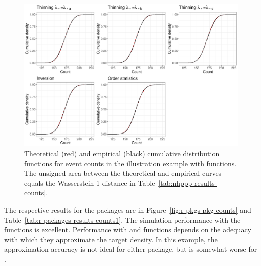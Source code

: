 \documentclass[article]{jss}\usepackage[]{graphicx}\usepackage[]{xcolor}
\makeatletter
\def\maxwidth{ %
  \ifdim\Gin@nat@width>\linewidth
    \linewidth
  \else
    \Gin@nat@width
  \fi
}
\makeatother
\begin{document}
\begin{Schunk}
\begin{figure}
\includegraphics[width=\maxwidth]{figure/ecdf-nhppp-pkg-counts-1} \caption{Theoretical (red) and empirical (black) cumulative distribution functions for event counts in the illustration example with  functions. The unsigned area between the theoretical and empirical curves equals the Wasserstein-1 distance in Table~\ref{tab:nhppp-results-counts}.}\label{fig:ecdf-nhppp-pkg-counts}
\end{figure}
\end{Schunk}





The respective results for the  packages are in Figure~\ref{fig:r-pkgs-pkg-counts} and Table~\ref{tab:r-packages-results-counts1}. The simulation performance with the  functions is excellent. Performance with  and  functions depends on the adequacy with which they approximate the target density. In this example, the approximation accuracy is not ideal for either package, but is somewhat worse for .
\end{document}
